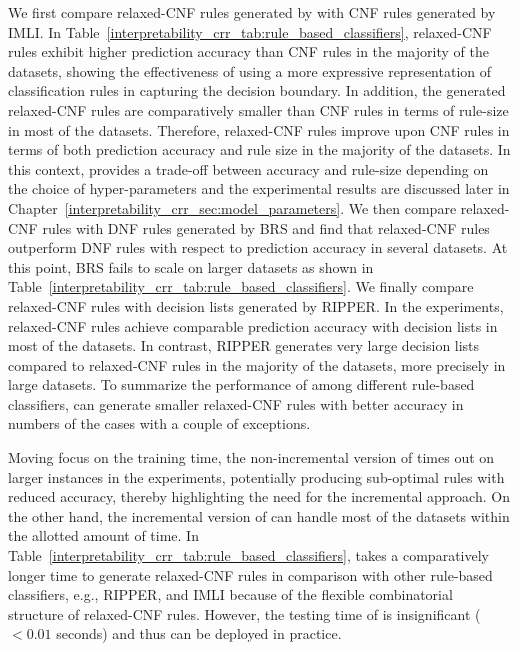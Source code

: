 We first compare relaxed-CNF rules generated by {\crr} with CNF rules generated by IMLI. In {Table}~\ref{interpretability_crr_tab:rule_based_classifiers}, relaxed-CNF rules exhibit higher prediction accuracy than CNF rules in the majority of the datasets, showing the effectiveness of using a more expressive representation of classification rules in capturing the decision boundary. In addition, the generated relaxed-CNF rules are comparatively smaller than CNF rules in terms of rule-size in most of the datasets. Therefore, relaxed-CNF rules improve upon CNF rules in terms of both prediction accuracy and rule size in the majority of the datasets. In this context, {\crr} provides a trade-off between accuracy and rule-size depending on the choice of hyper-parameters and the experimental results are discussed later in Chapter~\ref{interpretability_crr_sec:model_parameters}.  We then compare relaxed-CNF rules with DNF rules generated by BRS and find that relaxed-CNF rules outperform DNF rules with respect to prediction accuracy in several datasets. At this point,   BRS fails to scale on larger datasets as shown in Table~\ref{interpretability_crr_tab:rule_based_classifiers}. We finally compare relaxed-CNF rules with decision lists generated by RIPPER.  In the experiments, relaxed-CNF rules achieve comparable prediction accuracy with decision lists in most of the datasets. In contrast,   RIPPER generates very large decision lists compared to relaxed-CNF rules in the majority of the datasets, more precisely in large datasets.  To summarize the performance of {\crr} among different rule-based classifiers,  {\crr} can generate smaller relaxed-CNF rules with better accuracy in numbers of the cases with a couple of exceptions. 



Moving focus on the training time,  the non-incremental version of {\crr} times out on larger instances in the experiments, potentially producing sub-optimal rules with reduced accuracy, thereby highlighting the need for the incremental approach. On the other hand, the incremental version of {\crr} can handle most of the datasets within the allotted amount of time. In Table~\ref{interpretability_crr_tab:rule_based_classifiers}, {\crr} takes a comparatively longer time to generate relaxed-CNF rules in comparison with other rule-based classifiers, e.g., RIPPER, and IMLI because of  the flexible combinatorial structure of relaxed-CNF rules. However, the testing time of {\crr} is insignificant ($ < 0.01 $ seconds) and thus can 
 be deployed in practice.  
 
